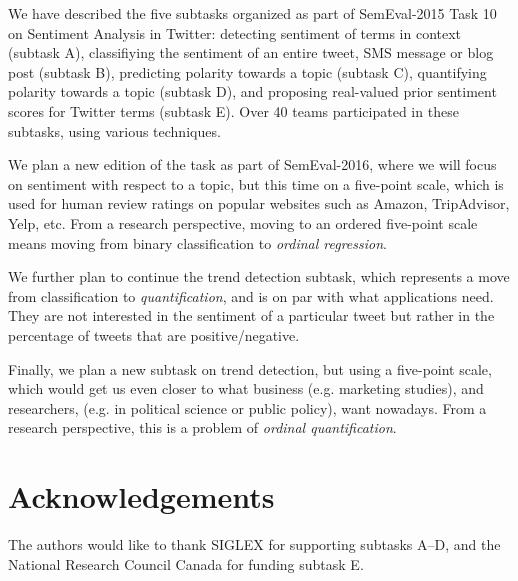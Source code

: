 \documentclass[11pt]{article}
\begin{document}
We have described the five subtasks organized as part of SemEval-2015 Task 10 on Sentiment Analysis in Twitter: detecting sentiment of terms in context (subtask A), classifiying the sentiment of an entire tweet, SMS message or blog post (subtask B), predicting polarity towards a topic (subtask C), quantifying polarity towards a topic (subtask D), and proposing real-valued prior sentiment scores for Twitter terms (subtask E). Over 40 teams participated in these subtasks, using various techniques.

We plan a new edition of the task as part of SemEval-2016,
where we will focus on sentiment with respect to a topic,
but this time on a five-point scale,
which is used for human review ratings on popular websites
such as Amazon, TripAdvisor, Yelp, etc.
From a research perspective, moving to an ordered five-point scale
means moving from binary classification to \emph{ordinal regression}.

We further plan to continue the trend detection subtask,
which represents a move from classification to \emph{quantification},
and is on par with what applications need.
They are not interested in the sentiment of a particular tweet
but rather in the percentage of tweets that are positive/negative.

Finally, we plan a new subtask on trend detection, but using a five-point scale,
which would get us even closer to what business (e.g. marketing studies),
and researchers, (e.g. in political science or public policy), want nowadays.
From a research perspective, this is a problem of \emph{ordinal quantification}.



\section*{Acknowledgements}

The authors would like to thank SIGLEX for supporting subtasks A--D,
and the National Research Council Canada for funding subtask E.





\end{document}
